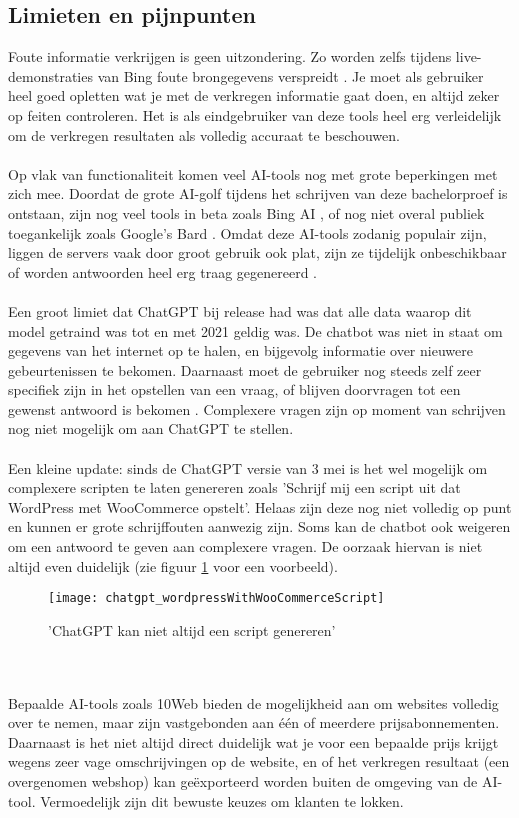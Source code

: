 \subsection{Limieten en pijnpunten}
Foute informatie verkrijgen is geen uitzondering. Zo worden zelfs tijdens live-demonstraties van Bing foute brongegevens verspreidt \autocite{Bellens2023}. Je moet als gebruiker heel goed opletten wat je met de verkregen informatie gaat doen, en altijd zeker op feiten controleren. Het is als eindgebruiker van deze tools heel erg verleidelijk om de verkregen resultaten als volledig accuraat te beschouwen.
\\\\
Op vlak van functionaliteit komen veel AI-tools nog met grote beperkingen met zich mee. Doordat de grote AI-golf tijdens het schrijven van deze bachelorproef is ontstaan, zijn nog veel tools in beta zoals Bing AI \autocite{Dent2023}, of nog niet overal publiek toegankelijk zoals Google's Bard \autocite{Dawes2023}. Omdat deze AI-tools zodanig populair zijn, liggen de servers vaak door groot gebruik ook plat, zijn ze tijdelijk onbeschikbaar of worden antwoorden heel erg traag gegenereerd \autocite{Leong2023}. 
\\\\
Een groot limiet dat ChatGPT bij release had was dat alle data waarop dit model getraind was tot en met 2021 geldig was. De chatbot was niet in staat om gegevens van het internet op te halen, en bijgevolg informatie over nieuwere gebeurtenissen te bekomen. Daarnaast moet de gebruiker nog steeds zelf zeer specifiek zijn in het opstellen van een vraag, of blijven doorvragen tot een gewenst antwoord is bekomen \autocite{Tips2022}. Complexere vragen zijn op moment van schrijven nog niet mogelijk om aan ChatGPT te stellen.
\\\\
Een kleine update: sinds de ChatGPT versie van 3 mei is het wel mogelijk om complexere scripten te laten genereren zoals 'Schrijf mij een script uit dat WordPress met WooCommerce opstelt'. Helaas zijn deze nog niet volledig op punt en kunnen er grote schrijffouten aanwezig zijn. Soms kan de chatbot ook weigeren om een antwoord te geven aan complexere vragen. De oorzaak hiervan is niet altijd even duidelijk (zie figuur \ref{chatgpt_weigert_complexe_vragen} voor een voorbeeld).
\begin{figure}
    \caption{'ChatGPT kan niet altijd een script genereren'}
    \label{chatgpt_weigert_complexe_vragen}
    \begin{center}
        \texttt{[image: chatgpt\_wordpressWithWooCommerceScript]}
    \end{center}
\end{figure}
\\\\
Bepaalde AI-tools zoals 10Web bieden de mogelijkheid aan om websites volledig over te nemen, maar zijn vastgebonden aan één of meerdere prijsabonnementen. Daarnaast is het niet altijd direct duidelijk wat je voor een bepaalde prijs krijgt wegens zeer vage omschrijvingen op de website, en of het verkregen resultaat (een overgenomen webshop) kan geëxporteerd worden buiten de omgeving van de AI-tool. Vermoedelijk zijn dit bewuste keuzes om klanten te lokken.  

